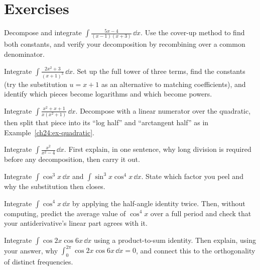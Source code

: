 \section{Exercises}
\label{ch24:exercises}

\begin{exercise}
Decompose and integrate $\displaystyle \int \frac{5x - 4}{(x-1)(x+3)}\,\dd x.$
Use the cover-up method to find both constants, and verify your decomposition
by recombining over a common denominator.
\end{exercise}

\begin{exercise}
Integrate $\displaystyle \int \frac{2x^2 + 3}{(x+1)^3}\,\dd x.$ Set up the full
tower of three terms, find the constants (try the substitution $u = x+1$ as an
alternative to matching coefficients), and identify which pieces become
logarithms and which become powers.
\end{exercise}

\begin{exercise}
Integrate $\displaystyle \int \frac{x^2 + x + 1}{x(x^2+1)}\,\dd x.$ Decompose
with a linear numerator over the quadratic, then split that piece into its
``log half'' and ``arctangent half'' as in
Example~\ref{ch24:ex-quadratic}.
\end{exercise}

\begin{exercise}
Integrate $\displaystyle \int \frac{x^2}{x^2 - 4}\,\dd x.$ First explain, in
one sentence, why long division is required before any decomposition, then
carry it out.
\end{exercise}

\begin{exercise}
Integrate $\displaystyle \int \cos^3 x\,\dd x$ and
$\displaystyle \int \sin^3 x\cos^4 x\,\dd x.$ State which factor you peel and
why the substitution then closes.
\end{exercise}

\begin{exercise}
Integrate $\displaystyle \int \cos^4 x\,\dd x$ by applying the half-angle
identity twice. Then, without computing, predict the average value of
$\cos^4 x$ over a full period and check that your antiderivative's linear part
agrees with it.
\end{exercise}

\begin{exercise}
Integrate $\displaystyle \int \cos 2x\cos 6x\,\dd x$ using a product-to-sum
identity. Then explain, using your answer, why $\int_0^{2\pi}\cos 2x\cos 6x\,
\dd x = 0$, and connect this to the orthogonality of distinct frequencies.
\end{exercise}

